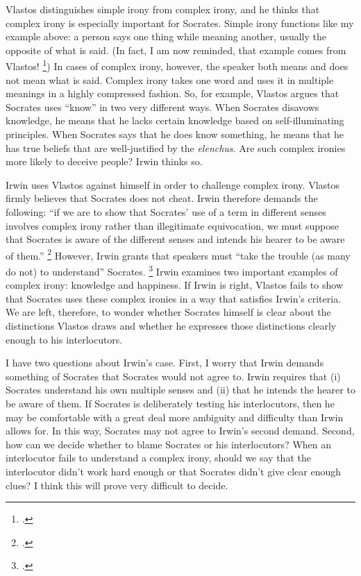 \documentclass[12pt,letterpaper]{article}
\begin{document}
Vlastos distinguishes simple irony from complex irony, and he thinks that complex irony is especially important for Socrates.
Simple irony functions like my example above: a person says one thing while meaning another, usually the opposite of what is said.
(In fact, I am now reminded, that example comes from Vlastos!
\footcite[][41, note 7]{vlastos-disavowal-1985}) In cases of complex irony, however, the speaker both means and does not mean what is said.
Complex irony takes one word and uses it in multiple meanings in a highly compressed fashion.
So, for example, Vlastos argues that Socrates uses ``know'' in two very different ways.
When Socrates disavows knowledge, he means that he lacks certain knowledge based on self-illuminating principles.
When Socrates says that he does know something, he means that he has true beliefs that are well-justified by the \textit{elenchus}.
Are such complex ironies more likely to deceive people?
Irwin thinks so.

Irwin uses Vlastos against himself in order to challenge complex irony.
Vlastos firmly believes that Socrates does not cheat.
Irwin therefore demands the following:
``if we are to show that Socrates' use of a term in different senses involves complex irony rather than illegitimate equivocation, we must suppose that Socrates is aware of the different senses and intends his hearer to be aware of them.''
\footcite[][246]{irwin-socratic-puzzles-1992}
However, Irwin grants that speakers must ``take the trouble (as many do not) to understand'' Socrates.
\footcite[][245]{irwin-socratic-puzzles-1992} Irwin examines two important examples of complex irony: knowledge and happiness.
If Irwin is right, Vlastos fails to show that Socrates uses these complex ironies in a way that satisfies Irwin's criteria.
We are left, therefore, to wonder whether Socrates himself is clear about the distinctions Vlastos draws and whether he expresses those distinctions clearly enough to his interlocutors.

I have two questions about Irwin's case.
First, I worry that Irwin demands something of Socrates that Socrates would not agree to.
Irwin requires that (i) Socrates understand his own multiple senses and (ii) that he intends the hearer to be aware of them.
If Socrates is deliberately testing his interlocutors, then he may be comfortable with a great deal more ambiguity and difficulty than Irwin allows for.
In this way, Socrates may not agree to Irwin's second demand.
Second, how can we decide whether to blame Socrates or his interlocutors?
When an interlocutor fails to understand a complex irony, should we say that the interlocutor didn't work hard enough or that Socrates didn't give clear enough clues?
I think this will prove very difficult to decide.
\end{document}
